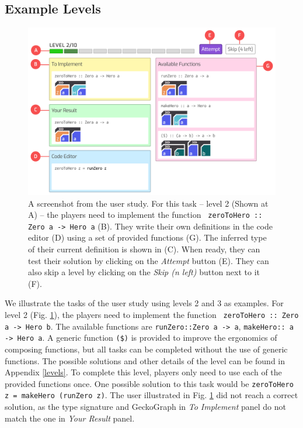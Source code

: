 \documentclass[preprint,12pt]{elsarticle}
\begin{document}
\subsection{Example Levels}
\begin{figure}[h]
  \includegraphics[width=\linewidth]{figures/Level2}
  \caption{\label{fig:level-example} A screenshot from the user study. For this task -- level 2 (Shown at A) -- the players need to implement the function \texttt{ zeroToHero :: Zero a -> Hero a} (B). They write their own definitions in the code editor (D) using a set of provided functions (G). The inferred type of their current definition is shown in (C). When ready, they can test their solution by clicking on the \textit{Attempt} button (E). They can also skip a level by clicking on the \textit{Skip (n left)} button next to it (F).}
  
\end{figure}

We illustrate the tasks of the user study using levels 2 and 3 as examples. For level 2 (Fig. \ref{fig:level-example}), the players need to implement the function \texttt{ zeroToHero :: Zero a -> Hero b}. The available functions are \texttt{runZero::Zero a -> a}, \texttt{makeHero:: a -> Hero a}. A generic function \texttt{(\$)} is provided to improve the ergonomics of composing functions, but all tasks can be completed without the use of generic functions. The possible solutions and other details of the level can be found in Appendix \ref{levels}. To complete this level, players only need to use each of the provided functions once. One possible solution to this task would be {\tt zeroToHero z = makeHero (runZero z)}. The user illustrated in Fig. \ref{fig:level-example} did not reach a correct solution, as the type signature and GeckoGraph in {\it To Implement} panel do not match the one in {\it Your Result} panel.
\end{document}

